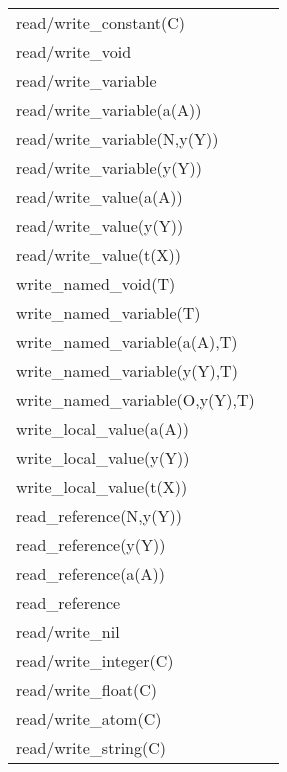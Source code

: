 \begin{tabular}{|l|l|}
\hline
read/write_constant(C)          &                 \\
read/write_void                 &         \\
read/write_variable             &         \\
read/write_variable(a(A))       &                 \\
read/write_variable(N,y(Y))     &                 \\
read/write_variable(y(Y))       &                 \\
read/write_value(a(A))          &                 \\
read/write_value(y(Y))          &                 \\
read/write_value(t(X))          &                 \\
write_named_void(T)             &                 \\
write_named_variable(T)         &                 \\
write_named_variable(a(A),T)    &                         \\
write_named_variable(y(Y),T)    &                         \\
write_named_variable(O,y(Y),T)  &                         \\
write_local_value(a(A))         &                 \\
write_local_value(y(Y))         &                 \\
write_local_value(t(X))         &                 \\
read_reference(N,y(Y))          &                 \\
read_reference(y(Y))            &                 \\
read_reference(a(A))            &                 \\
read_reference                  &         \\
read/write_nil                  &         \\
read/write_integer(C)           &         \\
read/write_float(C)             &         \\
read/write_atom(C)              &         \\
read/write_string(C)            &         \\
\hline
\end{tabular}

